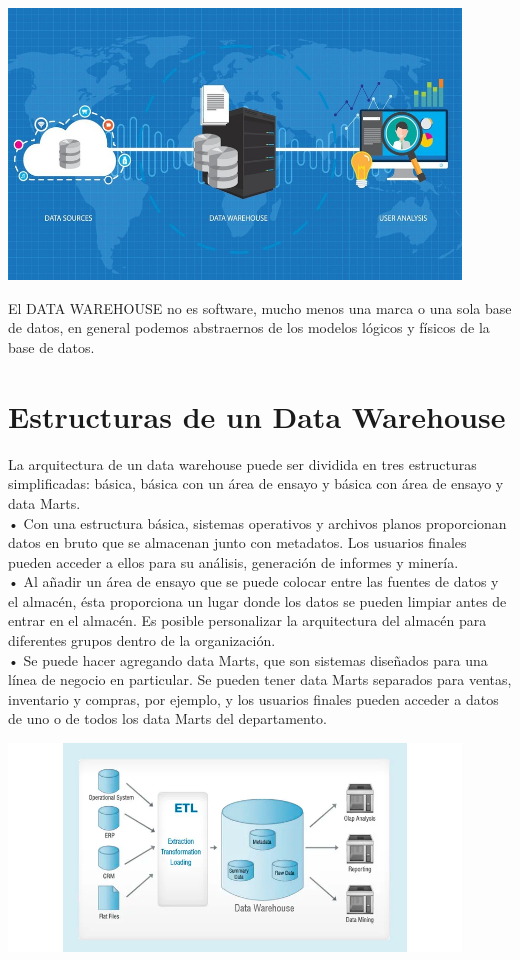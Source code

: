  \begin{center}
\includegraphics[width=12cm]{./Imagenes/image005}
\end{center}

El DATA WAREHOUSE no es software, mucho menos una marca o una sola base de datos, en general podemos abstraernos de los modelos lógicos y físicos de la base de datos.
 
\section{Estructuras de un Data Warehouse}
La arquitectura de un data warehouse puede ser dividida en tres estructuras simplificadas: básica, básica con un área de ensayo y básica con área de ensayo y data Marts.\\
•	Con una estructura básica, sistemas operativos y archivos planos proporcionan datos en bruto que se almacenan junto con metadatos. Los usuarios finales pueden acceder a ellos para su análisis, generación de informes y minería.\\
•	Al añadir un área de ensayo que se puede colocar entre las fuentes de datos y el almacén, ésta proporciona un lugar donde los datos se pueden limpiar antes de entrar en el almacén. Es posible personalizar la arquitectura del almacén para diferentes grupos dentro de la organización.\\
•	Se puede hacer agregando data Marts, que son sistemas diseñados para una línea de negocio en particular. Se pueden tener data Marts separados para ventas, inventario y compras, por ejemplo, y los usuarios finales pueden acceder a datos de uno o de todos los data Marts del departamento.\\
\begin{center}
\includegraphics[width=12cm]{./Imagenes/image007}
\end{center}
 
